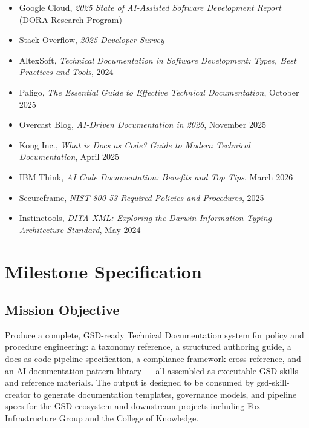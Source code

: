 \documentclass[11pt,letterpaper]{article}
\newcommand{\stageheader}[2]{%
  \noindent\colorbox{#2}{\makebox[\textwidth][l]{%
    \textcolor{white}{\bfseries\sffamily\hspace{6pt}#1\hspace{6pt}}}}%
  \vspace{0.5em}\par%
}
\begin{document}
\begin{itemize}[leftmargin=*]
  \item Google Cloud, \textit{2025 State of AI-Assisted Software Development Report} (DORA Research Program)
  \item Stack Overflow, \textit{2025 Developer Survey}
  \item AltexSoft, \textit{Technical Documentation in Software Development: Types, Best Practices and Tools}, 2024
  \item Paligo, \textit{The Essential Guide to Effective Technical Documentation}, October 2025
  \item Overcast Blog, \textit{AI-Driven Documentation in 2026}, November 2025
  \item Kong Inc., \textit{What is Docs as Code? Guide to Modern Technical Documentation}, April 2025
  \item IBM Think, \textit{AI Code Documentation: Benefits and Top Tips}, March 2026
  \item Secureframe, \textit{NIST 800-53 Required Policies and Procedures}, 2025
  \item Instinctools, \textit{DITA XML: Exploring the Darwin Information Typing Architecture Standard}, May 2024
\end{itemize}

\newpage
\stageheader{STAGE 3 --- MISSION PACKAGE}{tertiary}

\section{Milestone Specification}

\subsection{Mission Objective}

Produce a complete, GSD-ready Technical Documentation system for policy and procedure engineering: a taxonomy reference, a structured authoring guide, a docs-as-code pipeline specification, a compliance framework cross-reference, and an AI documentation pattern library --- all assembled as executable GSD skills and reference materials. The output is designed to be consumed by gsd-skill-creator to generate documentation templates, governance models, and pipeline specs for the GSD ecosystem and downstream projects including Fox Infrastructure Group and the College of Knowledge.
\end{document}
